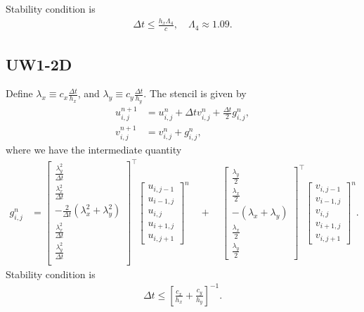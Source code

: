\documentclass[12pt]{article}
\begin{document}
Stability condition is \cite[lemma 3.5]{Banks2012}
\begin{align}
\Delta t \leq  \frac{h_x \Lambda_4}{c}, \quad \Lambda_4 \approx  1.09.
\end{align}


\subsection{UW1-2D}
Define $\lambda_x \equiv c_x \tfrac{\Delta t}{h_x}$, and $\lambda_y \equiv c_y \tfrac{\Delta t}{h_y}$. The stencil \cite[eq. (98)--(99)]{Banks2012} is given by
\begin{align}
u_{i,j}^{n+1} 
&= 
u_{i,j} ^n  + \Delta t v_{i,j}^n +  \tfrac{\Delta t}{2} g_{i,j} ^n,
\\
v_{i,j}^{n+1} 
&= 
v_{i,j} ^n + g_{i,j}^n,
\end{align}
where we have the intermediate quantity
\begin{align}
g_{i,j}^{n} &= 
\begin{bmatrix}
\tfrac{\lambda_y^2}{\Delta t} \\
\tfrac{\lambda_x^2}{\Delta t} \\
- \tfrac{2}{\Delta t}( \lambda_x^2 + \lambda_y^2) \\  
\tfrac{\lambda_x^2}{\Delta t} \\
\tfrac{\lambda_y^2}{\Delta t} \\
\end{bmatrix}^\top
\begin{bmatrix}
u_{i,j-1} \\
u_{i-1,j} \\
u_{i,j}  \\
u_{i+1,j} \\
u_{i,j+1}
\end{bmatrix}^n 
\quad 
+ 
\quad
\begin{bmatrix}
\tfrac{\lambda_y}{2} \\
\tfrac{\lambda_x}{2} \\
-(\lambda_x + \lambda_y) \\  
\tfrac{\lambda_x}{2} \\
\tfrac{\lambda_y}{2}
\end{bmatrix}^\top
\begin{bmatrix}
v_{i,j-1} \\
v_{i-1,j} \\
v_{i,j}  \\
v_{i+1,j} \\
v_{i,j+1}
\end{bmatrix}^n .
\end{align}
Stability condition is \cite[eq. (101)]{Banks2012}
\begin{align}
\Delta t \leq \left[ \frac{c_x}{h_x} +  \frac{c_y}{h_y}  \right]^{-1}.
\end{align}
\end{document}
